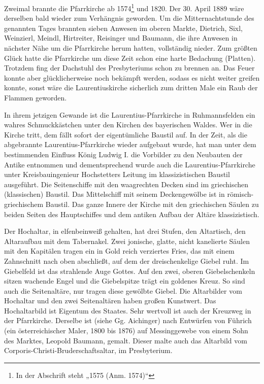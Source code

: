 \documentclass[12pt,a4paper]{book}
\begin{document}
Zweimal brannte die Pfarrkirche ab 1574\footnote{In der Abschrift steht „1575
(Anm. 1574)“} und 1820. Der 30. April 1889 wäre derselben bald wieder zum
Verhängnis geworden. Um die Mitternachtstunde des genannten Tages brannten
sieben Anwesen im oberen Markte, Dietrich, Sixl, Weinzierl, Meindl, Hirtreiter,
Reisinger und Baumann, die ihre Anwesen in nächster Nähe um die Pfarrkirche
herum hatten, vollständig nieder. Zum größten Glück hatte die Pfarrkirche um
diese Zeit schon eine harte Bedachung (Platten). Trotzdem fing der Dachstuhl des
Presbyteriums schon zu brennen an. Das Feuer konnte aber glücklicherweise noch
bekämpft werden, sodass es nicht weiter greifen konnte, sonst wäre die
Laurentiuskirche sicherlich zum dritten Male ein Raub der Flammen geworden.

In ihrem jetzigen Gewande ist die Laurentius-Pfarrkirche in Ruhmannsfelden ein
wahres Schmuckkästchen unter den Kirchen des bayerischen Waldes. Wer in die
Kirche tritt, dem fällt sofort der eigentümliche Baustil auf. In der Zeit, als
die abgebrannte Laurentius-Pfarrkirche wieder aufgebaut wurde, hat man unter dem
bestimmenden Einfluss König Ludwig I. die Vorbilder zu den Neubauten der Antike
entnommen und dementsprechend wurde auch die Laurentius-Pfarrkirche unter
Kreisbauingenieur Hochstetters Leitung im klassizistischen Baustil ausgeführt.
Die Seitenschiffe mit den waagrechten Decken sind im griechischen (klassischen)
Baustil. Das Mittelschiff mit seinem Deckengewölbe ist in römisch-griechischem
Baustil. Das ganze Innere der Kirche mit den griechischen Säulen zu beiden
Seiten des Hauptschiffes und dem antiken Aufbau der Altäre klassizistisch.

Der Hochaltar, in elfenbeinweiß gehalten, hat drei Stufen, den Altartisch, den
Altaraufbau mit dem Tabernakel. Zwei jonische, glatte, nicht kanelierte Säulen
mit den Kapitälen tragen ein in Gold reich verziertes Fries, das mit einem
Zahnschnitt nach oben abschließt, auf dem der dreischenkelige Giebel ruht. Im
Giebelfeld ist das strahlende Auge Gottes. Auf den zwei, oberen Giebelschenkeln
sitzen wachende Engel und die Giebelspitze trägt ein goldenes Kreuz. So sind
auch die Seitenaltäre, nur tragen diese gewölbte Giebel. Die Altarbilder vom
Hochaltar und den zwei Seitenaltären haben großen Kunstwert. Das Hochaltarbild
ist Eigentum des Staates. Sehr wertvoll ist auch der Kreuzweg in der
Pfarrkirche. Derselbe ist (siehe Gg. Aichinger) nach Entwürfen von Führich (ein
österreichischer Maler, 1800 bis 1876) auf Messinggewebe von einem Sohn des
Marktes, Leopold Baumann, gemalt. Dieser malte auch das Altarbild vom
Corporis-Christi-Bruderschaftsaltar, im Presbyterium.
\end{document}
